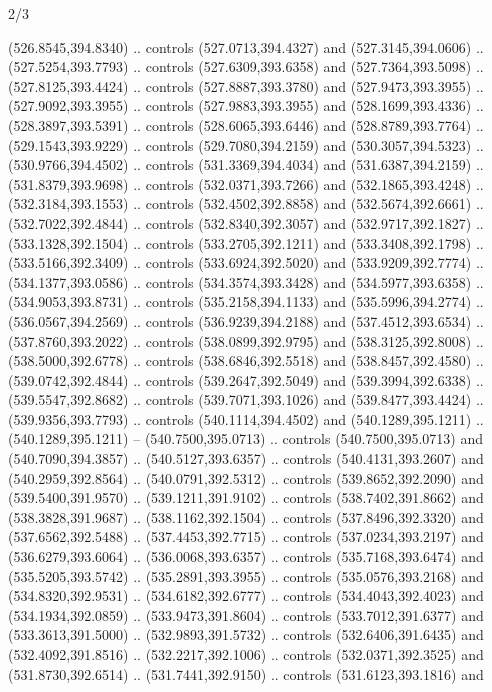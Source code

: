 \begin{flagdescription}{2/3}
\begin{scope}[xshift=0.5\flaglength,yshift=0.5\flagwidth,scale=\flagwidth/495.65]
\begin{scope}[y=0.8pt, x=0.8pt, yscale=-1,shift={(-463.76,-309.78)}]
  (526.8545,394.8340) .. controls (527.0713,394.4327) and (527.3145,394.0606) ..
  (527.5254,393.7793) .. controls (527.6309,393.6358) and (527.7364,393.5098) ..
  (527.8125,393.4424) .. controls (527.8887,393.3780) and (527.9473,393.3955) ..
  (527.9092,393.3955) .. controls (527.9883,393.3955) and (528.1699,393.4336) ..
  (528.3897,393.5391) .. controls (528.6065,393.6446) and (528.8789,393.7764) ..
  (529.1543,393.9229) .. controls (529.7080,394.2159) and (530.3057,394.5323) ..
  (530.9766,394.4502) .. controls (531.3369,394.4034) and (531.6387,394.2159) ..
  (531.8379,393.9698) .. controls (532.0371,393.7266) and (532.1865,393.4248) ..
  (532.3184,393.1553) .. controls (532.4502,392.8858) and (532.5674,392.6661) ..
  (532.7022,392.4844) .. controls (532.8340,392.3057) and (532.9717,392.1827) ..
  (533.1328,392.1504) .. controls (533.2705,392.1211) and (533.3408,392.1798) ..
  (533.5166,392.3409) .. controls (533.6924,392.5020) and (533.9209,392.7774) ..
  (534.1377,393.0586) .. controls (534.3574,393.3428) and (534.5977,393.6358) ..
  (534.9053,393.8731) .. controls (535.2158,394.1133) and (535.5996,394.2774) ..
  (536.0567,394.2569) .. controls (536.9239,394.2188) and (537.4512,393.6534) ..
  (537.8760,393.2022) .. controls (538.0899,392.9795) and (538.3125,392.8008) ..
  (538.5000,392.6778) .. controls (538.6846,392.5518) and (538.8457,392.4580) ..
  (539.0742,392.4844) .. controls (539.2647,392.5049) and (539.3994,392.6338) ..
  (539.5547,392.8682) .. controls (539.7071,393.1026) and (539.8477,393.4424) ..
  (539.9356,393.7793) .. controls (540.1114,394.4502) and (540.1289,395.1211) ..
  (540.1289,395.1211) -- (540.7500,395.0713) .. controls (540.7500,395.0713) and
  (540.7090,394.3857) .. (540.5127,393.6357) .. controls (540.4131,393.2607) and
  (540.2959,392.8564) .. (540.0791,392.5312) .. controls (539.8652,392.2090) and
  (539.5400,391.9570) .. (539.1211,391.9102) .. controls (538.7402,391.8662) and
  (538.3828,391.9687) .. (538.1162,392.1504) .. controls (537.8496,392.3320) and
  (537.6562,392.5488) .. (537.4453,392.7715) .. controls (537.0234,393.2197) and
  (536.6279,393.6064) .. (536.0068,393.6357) .. controls (535.7168,393.6474) and
  (535.5205,393.5742) .. (535.2891,393.3955) .. controls (535.0576,393.2168) and
  (534.8320,392.9531) .. (534.6182,392.6777) .. controls (534.4043,392.4023) and
  (534.1934,392.0859) .. (533.9473,391.8604) .. controls (533.7012,391.6377) and
  (533.3613,391.5000) .. (532.9893,391.5732) .. controls (532.6406,391.6435) and
  (532.4092,391.8516) .. (532.2217,392.1006) .. controls (532.0371,392.3525) and
  (531.8730,392.6514) .. (531.7441,392.9150) .. controls (531.6123,393.1816) and

\end{scope}
\end{scope}
\end{flagdescription}
